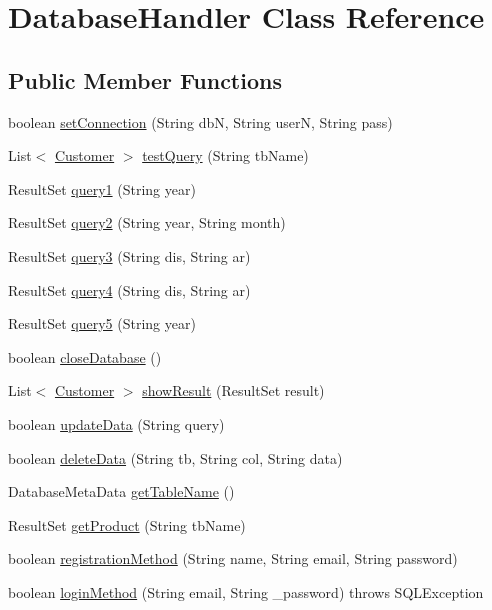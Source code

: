 \hypertarget{class_database_handler}{}\section{Database\+Handler Class Reference}
\label{class_database_handler}
\subsection*{Public Member Functions}
\begin{DoxyCompactItemize}
\item 
boolean \mbox{\hyperlink{class_database_handler_a8e77ef24c744312d8124bde6b7efd29f}{set\+Connection}} (String dbN, String userN, String pass)
\item 
List$<$ \mbox{\hyperlink{class_customer}{Customer}} $>$ \mbox{\hyperlink{class_database_handler_ac6ac13dad637b902451a26d621d22cf2}{test\+Query}} (String tb\+Name)
\item 
Result\+Set \mbox{\hyperlink{class_database_handler_ace2c7efee64daaf77266b6666614e017}{query1}} (String year)
\item 
Result\+Set \mbox{\hyperlink{class_database_handler_a079a6fbfaebaef4ae960c884bca7ac19}{query2}} (String year, String month)
\item 
Result\+Set \mbox{\hyperlink{class_database_handler_ab41175ec78b0fbe34153dae92b05ff3c}{query3}} (String dis, String ar)
\item 
Result\+Set \mbox{\hyperlink{class_database_handler_a6dd432cfb64e9579b93da8ca1b1ccff8}{query4}} (String dis, String ar)
\item 
Result\+Set \mbox{\hyperlink{class_database_handler_a63a618d22c1241c0d6b7165c1f1a5967}{query5}} (String year)
\item 
boolean \mbox{\hyperlink{class_database_handler_a4ae94f3d0326a638af3ff4fb4a90e976}{close\+Database}} ()
\item 
List$<$ \mbox{\hyperlink{class_customer}{Customer}} $>$ \mbox{\hyperlink{class_database_handler_a8130c818781d7b48cb2d46ae77090792}{show\+Result}} (Result\+Set result)
\item 
boolean \mbox{\hyperlink{class_database_handler_a45a6be08d6806eaf3b2730ce40c353e8}{update\+Data}} (String query)
\item 
boolean \mbox{\hyperlink{class_database_handler_ab63bedcd19c5e1596c6e693672cc479a}{delete\+Data}} (String tb, String col, String data)
\item 
Database\+Meta\+Data \mbox{\hyperlink{class_database_handler_aee7ff1913c7d5cf9453b9eca5e80648d}{get\+Table\+Name}} ()
\item 
Result\+Set \mbox{\hyperlink{class_database_handler_a12c440f6f040a17f9f651ce9edc5d608}{get\+Product}} (String tb\+Name)
\item 
boolean \mbox{\hyperlink{class_database_handler_af61e1c8fda7f53e1f1a047b1215c740e}{registration\+Method}} (String name, String email, String password)
\item 
boolean \mbox{\hyperlink{class_database_handler_abedcbb21da30f991f7b93b1db5c9b829}{login\+Method}} (String email, String \+\_\+password)  throws S\+Q\+L\+Exception 
\end{DoxyCompactItemize}


